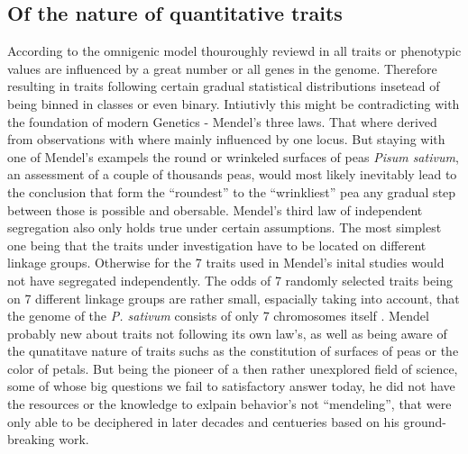 \subsection{Of the nature of quantitative traits}
According to the omnigenic model thouroughly reviewd in \cite{timpson2018} all traits or phenotypic values are influenced
by a great number or all genes in the genome. Therefore resulting in traits following certain gradual statistical distributions
insetead of being binned in classes or even binary. Intiutivly this might be contradicting with the foundation of modern Genetics -
Mendel's three laws. That where derived from observations with where mainly influenced by one locus. But staying with one of
Mendel's exampels the round or wrinkeled surfaces of  peas \textit{Pisum sativum}, an assessment of a couple of thousands peas, would
most likely inevitably
lead to the conclusion that form the ``roundest'' to the ``wrinkliest'' pea any gradual step between those is possible and obersable.
Mendel's third law of independent segregation also only holds true under certain assumptions. The most simplest one being that the traits
under investigation have to be located on different linkage groups. Otherwise for the 7 traits used in Mendel's inital studies would not have
segregated independently. The odds of 7 randomly selected traits being on 7 different linkage groups are rather small, espacially taking
into account, that the genome of the \textit{P. sativum} consists of only 7 chromosomes itself \cite{kalo2004}. Mendel probably new about
traits not following its own law's,
as well as being aware of the qunatitave nature of traits suchs as the constitution of surfaces of peas or the color of petals. But being the
pioneer of a then rather unexplored field of science, some of whose big questions we fail to satisfactory answer today, he did not have the
resources or the knowledge to exlpain behavior's not ``mendeling'', that were only able to be deciphered in later decades and centueries
based on his ground-breaking work. 



